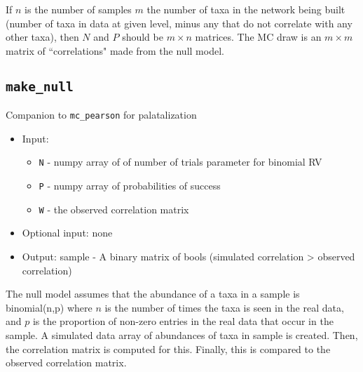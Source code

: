 \documentclass[10pt]{article}
\theoremstyle{definition}
\numberwithin{theorem}{section}
\numberwithin{definition}{section}
\numberwithin{lemma}{section}
\numberwithin{corollary}{section}
\numberwithin{clm}{section}
\numberwithin{rmk}{section}
\begin{document}
If $n$ is the number of samples $m$ the number of taxa in the network being built (number of taxa in data at given level, minus any that do not correlate with any other taxa), then $N$ and $P$ should be $m\times n$ matrices. The MC draw is an $m\times m$ matrix of ``correlations" made from the null model.

\cprotect \subsection{\verb|make_null|}

Companion to \verb|mc_pearson| for palatalization

\begin{itemize}
	\item Input: 
		\begin{itemize}
		\item \verb|N| - numpy array of of number of trials parameter for binomial RV
		\item  \verb|P| - numpy array of probabilities of success
		\item \verb|W| - the observed correlation matrix
	\end{itemize}
	\item Optional input: none
	\item Output: sample - A binary matrix of bools (simulated correlation > observed correlation)
\end{itemize}

The null model assumes that the abundance of a taxa in a sample is binomial(n,p) where $n$ is the number of times the taxa is seen in the real data, and $p$ is the proportion of non-zero entries in the real data that occur in the sample. A simulated data array of abundances of taxa in sample is created. Then, the correlation matrix is computed for this. Finally, this is compared to the observed correlation matrix.
\end{document}
